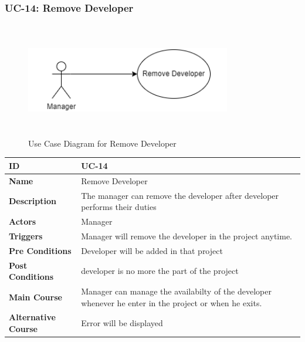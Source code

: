     \newpage

    \subsubsection{UC-14: Remove Developer}
    \begin{figure}[H]
        \includegraphics[height=5cm, width=0.8\textwidth]{./diagrams/Use Case/u14.png}
        \centering 
        \caption{Use Case Diagram for Remove Developer}
        \label{fig:Usecase1}
        \end{figure}
        
    \begin{center}
        \begin{tabularx}{\textwidth}{|l|X|}
            \hline
            \textbf{ID} & UC-14 \\
            \hline
            \textbf{Name} & Remove Developer \\
            \hline
            \textbf{Description} & The manager can remove the developer after developer performs their duties \\
            \hline
            \textbf{Actors} & Manager \\
            \hline
           \textbf{Triggers} & Manager will remove the developer in the project anytime. \\
            \hline
            \textbf{Pre Conditions} & Developer will be added in that project \\
            \hline
            \textbf{Post Conditions} & developer is no more the part of the project \\
            \hline
            \textbf{Main Course} & Manager can manage the availabilty of the developer whenever he enter in the project or when he exits. \\
            \hline
            \textbf{Alternative Course} & Error will be displayed \\
            \hline
            
        \end{tabularx}
    \end{center}
    \newpage
    

